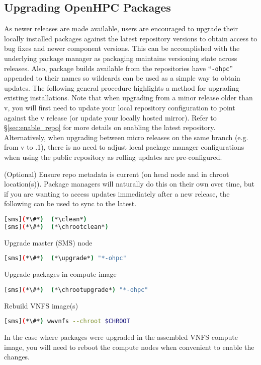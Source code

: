 \subsection{Upgrading OpenHPC Packages}  \label{appendix:upgrade}


As newer \OHPC{} releases are made available, users are encouraged to upgrade
their locally installed packages against the latest repository versions to
obtain access to bug fixes and newer component versions. This can be
accomplished with the underlying package manager as \OHPC{} packaging maintains
versioning state across releases. Also, package builds available from the
\OHPC{} repositories have ``\texttt{-ohpc}'' appended to their names so
wildcards can be used as a simple way to obtain updates. The following general
procedure highlights a method for upgrading existing installations.  Note that
when upgrading from a minor release older than v\OHPCVerTree{}, you will first
need to update your local \OHPC{} repository configuration to point against the
v\OHPCVerTree{} release (or update your locally hosted mirror). Refer to
\S\ref{sec:enable_repo} for more details on enabling the latest
repository. Alternatively, when upgrading between micro releases on the same
branch (e.g. from v\OHPCVerTree{} to \OHPCVerTree{}.1), there is no need to
adjust local package manager configurations when using the public repository as
rolling updates are pre-configured.
 
\begin{enumerate*}
\item (Optional) Ensure repo metadata is current (on head node and in chroot
  location(s)). Package managers will naturally do this on their own over time,
  but if you are wanting to access updates immediately after a new release,
  the following can be used to sync to the latest.

\begin{lstlisting}[language=bash,keywords={}]
[sms](*\#*)  (*\clean*)
[sms](*\#*)  (*\chrootclean*)
\end{lstlisting}

\item Upgrade master (SMS) node

\begin{lstlisting}[language=bash,keywords={}]
[sms](*\#*)  (*\upgrade*) "*-ohpc"
\end{lstlisting}
  
\item Upgrade packages in compute image

\begin{lstlisting}[language=bash,keywords={}]
[sms](*\#*)  (*\chrootupgrade*) "*-ohpc"
\end{lstlisting}
  
\item Rebuild VNFS image(s)

\begin{lstlisting}[language=bash,keywords={}]
[sms](*\#*) wwvnfs --chroot $CHROOT
\end{lstlisting}

\end{enumerate*}

\noindent In the case where packages were upgraded in the assembled VNFS compute image,
you will need to reboot the compute nodes when convenient to enable the
changes.

